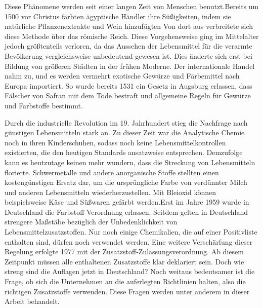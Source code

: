 \documentclass[11pt]{scrreprt}
\begin{document}
Diese Phänomene werden seit einer langen Zeit von Menschen benutzt.Bereits um 1500 vor Christus färbten ägyptische Händler ihre Süßigkeiten, indem sie natürliche Pflanzenextrakte und Wein hinzufügten Von dort aus verbreitete sich diese Methode über das römische Reich. Diese Vorgehensweise ging im Mittelalter jedoch größtenteils verloren, da das Aussehen der Lebensmittel für die verarmte Bevölkerung vergleichsweise unbedeutend gewesen ist\parencite{HarryMeggos.1995}. Dies änderte sich erst bei Bildung von größeren Städten in der frühen Moderne. Der internationale Handel nahm zu, und es werden vermehrt exotische Gewürze und Färbemittel nach Europa importiert. So wurde bereits 1531 ein Gesetz in Augsburg erlassen, dass Fälscher von Safran mit dem Tode bestraft und allgemeine Regeln für Gewürze und Farbstoffe bestimmt.

Durch die industrielle Revolution im 19. Jahrhundert stieg die Nachfrage nach günstigen Lebensmitteln stark an. Zu dieser Zeit war die Analytische Chemie noch in ihren Kinderschuhen, sodass noch keine Lebensmittelkontrollen existierten, die den heutigen Standards ansatzweise entsprechen.  Demzufolge kann es heutzutage keinen mehr wundern, dass die Streckung von Lebensmitteln florierte. Schwermetalle und andere anorganische Stoffe stellten einen kostengünstigen Ersatz dar, um die ursprüngliche Farbe von verdünnter Milch und anderen Lebensmitteln wiederherzustellen. Mit Bleioxid können beispielsweise Käse und Süßwaren gefärbt werden\parencite{Natcol.2016,Downham.2000}.Erst im Jahre 1959 wurde in Deutschland die Farbstoff-Verordnung erlassen. Seitdem gelten in Deutschland strengere Maßstäbe bezüglich der Unbedenklichkeit von Lebensmittelzusatzstoffen. Nur noch einige Chemikalien, die auf einer Positivliste enthalten sind, dürfen noch verwendet werden. Eine weitere Verschärfung dieser Regelung erfolgte 1977 mit der Zusatzstoff-Zulassungsverordnung. Ab diesem Zeitpunkt müssen alle enthaltenen Zusatzstoffe klar deklariert sein\parencite[S.48-49]{Heinze.1986}.
Doch wie streng sind die Auflagen jetzt in Deutschland? Noch weitaus bedeutsamer ist die Frage, ob sich die Unternehmen an die auferlegten Richtlinien halten, also die richtigen Zusatzstoffe verwenden. Diese Fragen werden unter anderem in dieser Arbeit behandelt.


%
\end{document}
